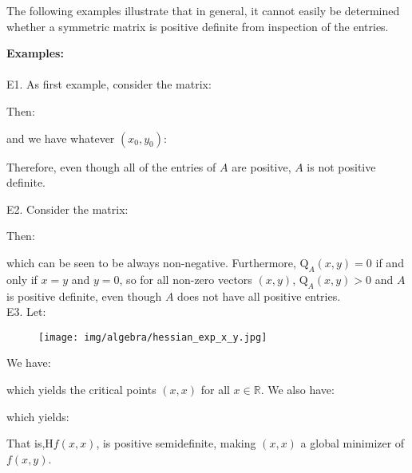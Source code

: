 	The following examples illustrate that in general, it cannot easily be determined whether a symmetric matrix is positive definite from inspection of the entries.
	\begin{tcolorbox}[colframe=black,colback=white,sharp corners]
	\textbf{{\Large {}}Examples:}\\\\
	E1. As first example, consider the matrix:
	
	Then:
	
	and we have whatever $(x_0,y_0)$:
	
	Therefore, even though all of the entries of $A$ are positive, $A$ is not positive definite.
	\end{tcolorbox}
	\begin{tcolorbox}[colframe=black,colback=white,sharp corners]
	E2. Consider the matrix:
	
	Then:
	
	which can be seen to be always non-negative. Furthermore, $ \mathrm{Q}_A(x,y) =0 $ if and only if $x = y$ and $y =0$, so for all non-zero vectors $(x,y)$, $ \mathrm{Q}_A(x,y) >0 $ and $A$ is positive definite, even though $A$ does not have all positive entries.\\
	
	E3. Let:
	
	\begin{figure}[H]
		\centering
		\texttt{[image: img/algebra/hessian\_exp\_x\_y.jpg]}
	\end{figure}
	We have:
	
	which yields the critical points $(x, x)$ for all $x \in \mathds{R}$. We also have:
	
	which yields:
	
	That is,$\mathrm{H}f(x,x)$, is positive semidefinite, making $(x,x)$ a global minimizer of $f(x,y)$.
	\end{tcolorbox}
	
